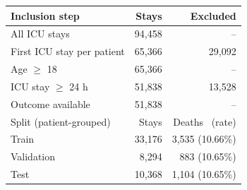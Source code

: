\begin{tabular}{@{}lrr@{}}
\toprule
Inclusion step & Stays & Excluded \\
\midrule
All ICU stays & 94,458 & -- \\
First ICU stay per patient & 65,366 & 29,092 \\
Age $\geq$ 18 & 65,366 & -- \\
ICU stay $\geq$ 24 h & 51,838 & 13,528 \\
Outcome available & 51,838 & -- \\
\midrule
Split (patient-grouped) & Stays & Deaths \ (rate) \\
\midrule
Train & 33,176 & 3,535 (10.66\%) \\
Validation & 8,294 & 883 (10.65\%) \\
Test & 10,368 & 1,104 (10.65\%) \\
\bottomrule
\end{tabular}
